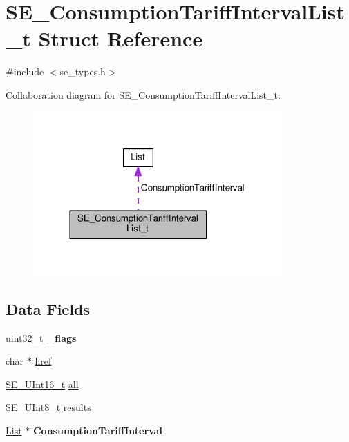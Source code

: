 \hypertarget{structSE__ConsumptionTariffIntervalList__t}{}\section{S\+E\+\_\+\+Consumption\+Tariff\+Interval\+List\+\_\+t Struct Reference}
\label{structSE__ConsumptionTariffIntervalList__t}


{\ttfamily \#include $<$se\+\_\+types.\+h$>$}



Collaboration diagram for S\+E\+\_\+\+Consumption\+Tariff\+Interval\+List\+\_\+t\+:\nopagebreak
\begin{figure}[H]
\begin{center}
\leavevmode
\includegraphics[width=270pt]{structSE__ConsumptionTariffIntervalList__t__coll__graph}
\end{center}
\end{figure}
\subsection*{Data Fields}
\begin{DoxyCompactItemize}
\item 
uint32\+\_\+t {\bfseries \+\_\+flags}
\item 
char $\ast$ \hyperlink{group__ConsumptionTariffIntervalList_ga489e67a6df6a55b687177b242b485f48}{href}
\item 
\hyperlink{group__UInt16_gac68d541f189538bfd30cfaa712d20d29}{S\+E\+\_\+\+U\+Int16\+\_\+t} \hyperlink{group__ConsumptionTariffIntervalList_ga76cb598a0b38538fdd3a63b1a828b686}{all}
\item 
\hyperlink{group__UInt8_gaf7c365a1acfe204e3a67c16ed44572f5}{S\+E\+\_\+\+U\+Int8\+\_\+t} \hyperlink{group__ConsumptionTariffIntervalList_gad7dfbe5bbec12b1511d6f80a360f710f}{results}
\item 
\hyperlink{structList}{List} $\ast$ {\bfseries Consumption\+Tariff\+Interval}
\end{DoxyCompactItemize}



